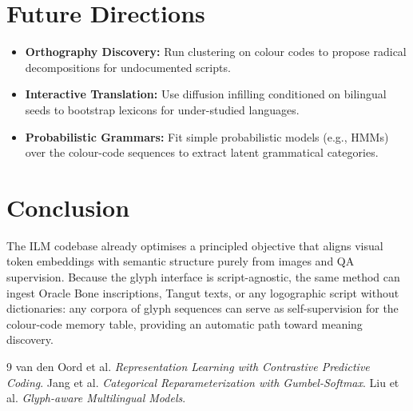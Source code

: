 \documentclass[11pt]{article}
\begin{document}
\section{Future Directions}
\begin{itemize}
    \item \textbf{Orthography Discovery:} Run clustering on colour codes to propose radical decompositions for undocumented scripts.
    \item \textbf{Interactive Translation:} Use diffusion infilling conditioned on bilingual seeds to bootstrap lexicons for under-studied languages.
    \item \textbf{Probabilistic Grammars:} Fit simple probabilistic models (e.g., HMMs) over the colour-code sequences to extract latent grammatical categories.
\end{itemize}

\section{Conclusion}
The ILM codebase already optimises a principled objective that aligns visual token embeddings with semantic structure purely from images and QA supervision. Because the glyph interface is script-agnostic, the same method can ingest Oracle Bone inscriptions, Tangut texts, or any logographic script without dictionaries: any corpora of glyph sequences can serve as self-supervision for the colour-code memory table, providing an automatic path toward meaning discovery.


\begin{thebibliography}{9}
 van den Oord et al. \emph{Representation Learning with Contrastive Predictive Coding}.
 Jang et al. \emph{Categorical Reparameterization with Gumbel-Softmax}.
 Liu et al. \emph{Glyph-aware Multilingual Models}.
\end{thebibliography}
\end{document}
